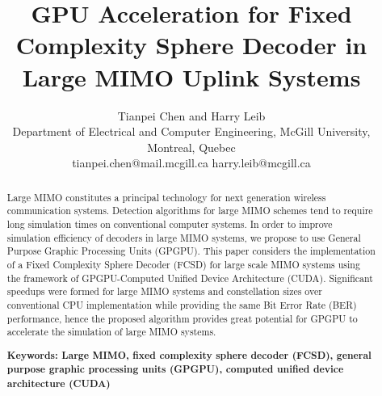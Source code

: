 \documentclass[letterpaper, 10pt, conference,twoside]{ieeeconf}
\title{\LARGE \bf GPU Acceleration for Fixed Complexity Sphere Decoder in Large MIMO Uplink Systems}
\author{Tianpei Chen and Harry Leib\\
Department of Electrical and Computer Engineering, McGill University, Montreal, Quebec\\
tianpei.chen@mail.mcgill.ca harry.leib@mcgill.ca}
\begin{document}
\maketitle
\thispagestyle{fancy} %
\lhead{} %
\chead{} %
\rhead{} %
\lfoot{} %
\cfoot{} %
\rfoot{} %
\renewcommand{\headrulewidth}{0pt} %
\renewcommand{\footrulewidth}{0pt} %
\pagestyle{fancy}  
\fancyhead[RO,LE]{\thepage}  
\begin{abstract}
Large MIMO constitutes a principal technology for next generation wireless communication systems. Detection algorithms for large MIMO schemes tend to require long simulation times on conventional computer systems. In order to improve simulation efficiency of decoders in large MIMO systems, we propose to use General Purpose Graphic Processing Units (GPGPU). This paper considers the implementation of a Fixed Complexity Sphere Decoder (FCSD) for large scale MIMO systems using the framework of GPGPU-Computed Unified Device Architecture (CUDA). Significant speedups were formed for large MIMO systems and constellation sizes over conventional CPU implementation while providing the same Bit Error Rate (BER) performance, hence the proposed algorithm provides great potential for GPGPU to accelerate the simulation of large MIMO systems.

\textbf{ Keywords: Large MIMO, fixed complexity sphere decoder (FCSD), general purpose graphic processing units (GPGPU), computed unified device architecture (CUDA)}
\end{abstract}





%
\end{document}
